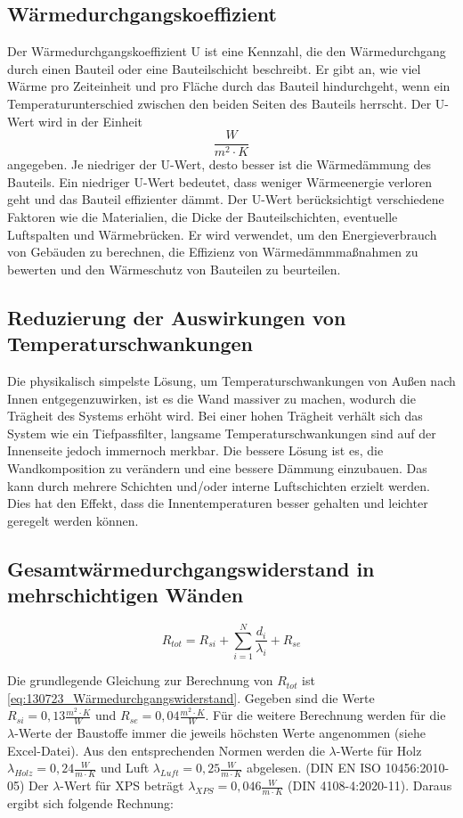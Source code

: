 \subsection{Wärmedurchgangskoeffizient}
Der Wärmedurchgangskoeffizient U ist eine Kennzahl, die den Wärmedurchgang durch einen Bauteil oder eine Bauteilschicht beschreibt. 
Er gibt an, wie viel Wärme pro Zeiteinheit und pro Fläche durch das Bauteil hindurchgeht, wenn ein Temperaturunterschied zwischen den beiden Seiten des Bauteils herrscht.
Der U-Wert wird in der Einheit $$\frac{W}{m^2 \cdot K}$$ angegeben. Je niedriger der U-Wert, desto besser ist die Wärmedämmung des Bauteils. 
Ein niedriger U-Wert bedeutet, dass weniger Wärmeenergie verloren geht und das Bauteil effizienter dämmt.
Der U-Wert berücksichtigt verschiedene Faktoren wie die Materialien, die Dicke der Bauteilschichten, eventuelle Luftspalten und Wärmebrücken. 
Er wird verwendet, um den Energieverbrauch von Gebäuden zu berechnen, die Effizienz von Wärmedämmmaßnahmen zu bewerten und den Wärmeschutz von Bauteilen zu beurteilen.

\subsection{Reduzierung der Auswirkungen von Temperaturschwankungen}

Die physikalisch simpelste Lösung, um Temperaturschwankungen von Außen nach Innen entgegenzuwirken, ist es die Wand massiver zu machen, wodurch die Trägheit des Systems erhöht wird.
Bei einer hohen Trägheit verhält sich das System wie ein Tiefpassfilter, langsame Temperaturschwankungen sind auf der Innenseite jedoch immernoch merkbar.
Die bessere Lösung ist es, die Wandkomposition zu verändern und eine bessere Dämmung einzubauen.
Das kann durch mehrere Schichten und/oder interne Luftschichten erzielt werden.
Dies hat den Effekt, dass die Innentemperaturen besser gehalten und leichter geregelt werden können.

\subsection{Gesamtwärmedurchgangswiderstand in mehrschichtigen Wänden}
\begin{equation}
	\label{eq:130723_Wärmedurchgangswiderstand}
	R_{tot}=R_{si}+\sum_{i=1}^N \frac{d_i}{\lambda_i}+R_{se}
\end{equation}

Die grundlegende Gleichung zur Berechnung von $R_{tot}$ ist \autoref{eq:130723_Wärmedurchgangswiderstand}. Gegeben sind die Werte $R_{si}=0,13\frac{m^2 \cdot K}{W}$ und $R_{se}=0,04\frac{m^2 \cdot K}{W}$.
Für die weitere Berechnung werden für die $\lambda$-Werte der Baustoffe immer die jeweils höchsten Werte angenommen (siehe Excel-Datei). Aus den entsprechenden Normen werden
die $\lambda$-Werte für Holz \cite[S.20]{lamda-holz-luft} $\lambda_{Holz}=0,24\frac{W}{m\cdot K}$ und Luft\cite[S. 15]{lamda-holz-luft} $\lambda_{Luft}=0,25\frac{W}{m\cdot K}$ abgelesen. (DIN EN ISO 10456:2010-05)
Der $\lambda$-Wert für XPS \cite[S.23]{lamda-xps} beträgt $\lambda_{XPS}=0,046\frac{W}{m\cdot K}$ (DIN 4108-4:2020-11). Daraus ergibt sich folgende Rechnung:

